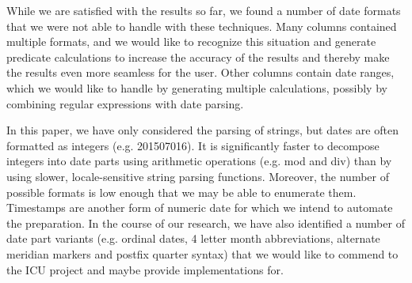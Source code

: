 While we are satisfied with the results so far, we found a number of date formats that we were not able to handle with these techniques. Many columns contained multiple formats, and we would like to recognize this situation and generate predicate calculations to increase the accuracy of the results and thereby make the results even more seamless for the user. Other columns contain date ranges, which we would like to handle by generating multiple calculations, possibly by combining regular expressions with date parsing.

In this paper, we have only considered the parsing of strings, but dates are often formatted as integers (e.g. 201507016). It is significantly faster to decompose integers into date parts using arithmetic operations (e.g. mod and div) than by using slower, locale-sensitive string parsing functions. Moreover, the number of possible formats is low enough that we may be able to enumerate them. Timestamps are another form of numeric date for which we intend to automate the preparation.
In the course of our research, we have also identified a number of date part variants (e.g. ordinal dates, 4 letter month abbreviations, alternate meridian markers and postfix quarter syntax) that we would like to commend to the ICU project and maybe provide implementations for.
